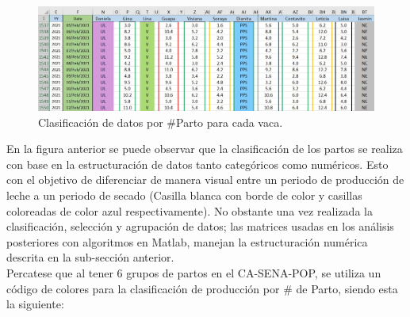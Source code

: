 \begin{figure}[H]
	 \begin{center}
	 \includegraphics[scale=0.45]{img/dfcolorpartos.jpg}
	 \end{center}
	 \caption{Clasificación de datos por \#Parto para cada vaca. \label{colorpartospng}}
\end{figure}

En la figura anterior se puede observar que la clasificación de los partos se realiza con base en la estructuración de datos tanto categóricos como numéricos. Esto con el objetivo de diferenciar de manera visual entre un periodo de producción de leche a un periodo de secado (Casilla blanca con borde de color y casillas coloreadas de color azul respectivamente). No obstante una vez realizada la clasificación, selección y agrupación de datos; las matrices usadas en los análisis posteriores con algoritmos en Matlab, manejan la estructuración numérica descrita en la sub-sección anterior.\\

Percatese que al tener 6 grupos de partos en el CA-SENA-POP, se utiliza un código de colores para la clasificación de producción por \# de Parto, siendo esta la siguiente:

